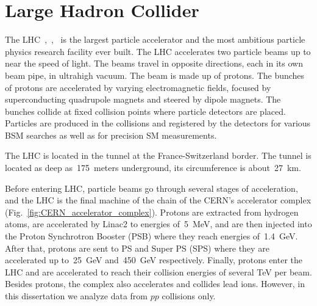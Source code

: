 \section{Large Hadron Collider}
\label{sec:Exp_LHC}

The LHC~\cite{ref_LHC_brochure},~\cite{ref_LHC_TDR},~\cite{ref_LHC_website} is the largest particle accelerator and the most ambitious particle physics research facility ever built. The LHC accelerates two particle beams up to near the speed of light. The beams travel in opposite directions, each in its own beam pipe, in ultrahigh vacuum. The beam is made up of protons. The bunches of protons are accelerated by varying electromagnetic fields, focused by superconducting quadrupole magnets and steered by dipole magnets. The bunches collide at fixed collision points where particle detectors are placed. Particles are produced in the collisions and registered by the detectors for various BSM searches as well as for precision SM measurements. 


The LHC is located in the tunnel at the France-Switzerland border. The tunnel is located as deep as~175~meters underground, its circumference is about~27~km.

Before entering LHC, particle beams go through several stages of acceleration, and the LHC is the final machine of the chain of the CERN's accelerator complex (Fig.~\ref{fig:CERN_accelerator_complex}). Protons are extracted from hydrogen atoms, are accelerated by Linac2 to energies of~5~MeV, and are then injected into the Proton Synchrotron Booster (PSB) where they reach energies of~1.4~GeV. After that, protons are sent to PS and Super PS (SPS) where they are accelerated up to~25~GeV and~450~GeV respectively. Finally, protons enter the LHC and are accelerated to reach their collision energies of several TeV per beam. Besides protons, the complex also accelerates and collides lead ions. However, in this dissertation we analyze data from $pp$ collisions only.   

